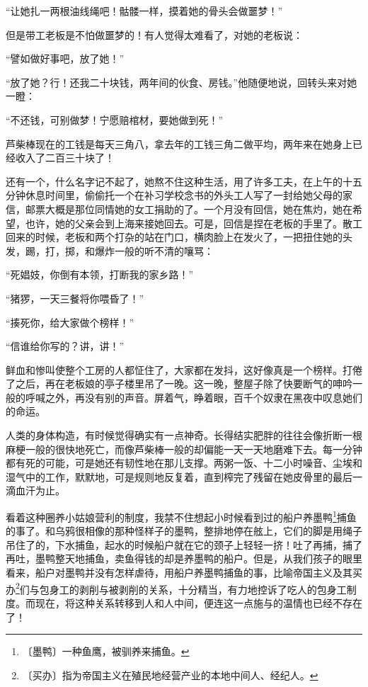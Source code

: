 \documentclass[12pt,UTF-8,openany]{ctexbook}
\begin{document}
\begin{normalsize}
    “让她扎一两根油线绳吧！骷髅一样，摸着她的骨头会做噩梦！”
    
    但是带工老板是不怕做噩梦的！有人觉得太难看了，对她的老板说：
    
    “譬如做好事吧，放了她！”
    
    “放了她？行！还我二十块钱，两年间的伙食、房钱。”他随便地说，回转头来对她一瞪：
    
    “不还钱，可别做梦！宁愿赔棺材，要她做到死！”
    
    芦柴棒现在的工钱是每天三角八，拿去年的工钱三角二做平均，两年来在她身上已经收入了二百三十块了！
    
    还有一个，什么名字记不起了，她熬不住这种生活，用了许多工夫，在上午的十五分钟休息时间里，偷偷托一个在补习学校念书的外头工人写了一封给她父母的家信，邮票大概是那位同情她的女工捐助的了。一个月没有回信，她在焦灼，她在希望，也许，她的父亲会到上海来接她回去。可是，回信是捏在老板的手里了。散工回来的时候，老板和两个打杂的站在门口，横肉脸上在发火了，一把扭住她的头发，踢，打，掷，和爆炸一般的听不清的嚷骂：
    
    “死娼妓，你倒有本领，打断我的家乡路！”
    
    “猪猡，一天三餐将你喂昏了！”
    
    “揍死你，给大家做个榜样！”
    
    “信谁给你写的？讲，讲！”
    
    鲜血和惨叫使整个工房的人都怔住了，大家都在发抖，这好像真是一个榜样。打倦了之后，再在老板娘的亭子楼里吊了一晚。这一晚，整屋子除了快要断气的呻吟一般的呼喊之外，再没有别的声音。屏着气，睁着眼，百千个奴隶在黑夜中叹息她们的命运。
    
    人类的身体构造，有时候觉得确实有一点神奇。长得结实肥胖的往往会像折断一根麻梗一般的很快地死亡，而像芦柴棒一般的却偏能一天一天地磨难下去。每一分钟都有死的可能，可是她还有韧性地在那儿支撑。两粥一饭、十二小时噪音、尘埃和湿气中的工作，默默地，可是规则地反复着，直到榨完了残留在她皮骨里的最后一滴血汗为止。
    
    看着这种圈养小姑娘营利的制度，我禁不住想起小时候看到过的船户养墨鸭\footnote{〔墨鸭〕一种鱼鹰，被驯养来捕鱼。}捕鱼的事了。和乌鸦很相像的那种怪样子的墨鸭，整排地停在舷上，它们的脚是用绳子吊住了的，下水捕鱼，起水的时候船户就在它的颈子上轻轻一挤！吐了再捕，捕了再吐，墨鸭整天地捕鱼，卖鱼得钱的却是养墨鸭的船户。但是，从我们孩子的眼里看来，船户对墨鸭并没有怎样虐待，用船户养墨鸭捕鱼的事，比喻帝国主义及其买办\footnote{〔买办〕指为帝国主义在殖民地经营产业的本地中间人、经纪人。}们与包身工的剥削与被剥削的关系，十分精当，有力地控诉了吃人的包身工制度。而现在，将这种关系转移到人和人中间，便连这一点施与的温情也已经不存在了！
    

\end{normalsize}
\end{document}
